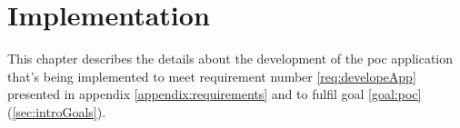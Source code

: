 \chapter{Implementation}\label{impl}
This chapter describes the details about the development of the \acrshort{poc} application that's being implemented to meet requirement number \ref{req:developeApp} presented in appendix \ref{appendix:requirements} and to fulfil goal \ref{goal:poc} (\cref{sec:introGoals}).





